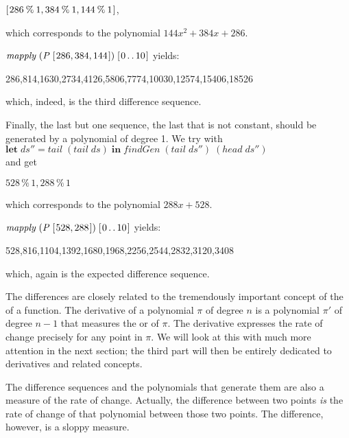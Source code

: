 \documentclass[tikz]{scrreprt}
\newcommand{\Conid}[1]{\mathit{#1}}
\newcommand{\Varid}[1]{\mathit{#1}}
\begin{document}
\ensuremath{[\mskip1.5mu \mathrm{286}\mathbin{\%}\mathrm{1},\mathrm{384}\mathbin{\%}\mathrm{1},\mathrm{144}\mathbin{\%}\mathrm{1}\mskip1.5mu]},

which corresponds to the polynomial 
$144x^2 + 384x + 286$.

\ensuremath{\Varid{mapply}\;(\Conid{P}\;[\mskip1.5mu \mathrm{286},\mathrm{384},\mathrm{144}\mskip1.5mu])\;[\mskip1.5mu \mathrm{0}\mathinner{\ldotp\ldotp}\mathrm{10}\mskip1.5mu]} yields:

286,814,1630,2734,4126,5806,7774,10030,12574,15406,18526

which, indeed, is the third difference sequence.

Finally, the last but one sequence, the last
that is not constant, should be generated by a polynomial
of degree 1. We try with\\
\ensuremath{\mathbf{let}\;\Varid{ds''}\mathrel{=}\Varid{tail}\;(\Varid{tail}\;\Varid{ds})\;\mathbf{in}\;\Varid{findGen}\;(\Varid{tail}\;\Varid{ds''})\;(\Varid{head}\;\Varid{ds''})}\\
and get 

\ensuremath{\mathrm{528}\mathbin{\%}\mathrm{1},\mathrm{288}\mathbin{\%}\mathrm{1}}

which corresponds to the polynomial $288x + 528$.

\ensuremath{\Varid{mapply}\;(\Conid{P}\;[\mskip1.5mu \mathrm{528},\mathrm{288}\mskip1.5mu])\;[\mskip1.5mu \mathrm{0}\mathinner{\ldotp\ldotp}\mathrm{10}\mskip1.5mu]} yields:

528,816,1104,1392,1680,1968,2256,2544,2832,3120,3408

which, again is the expected difference sequence.

The differences are closely related to the tremendously
important concept of the  of a function.
The derivative of a polynomial $\pi$ of degree $n$
is a polynomial $\pi'$ of degree $n-1$ that measures
the  or  of $\pi$.
The derivative expresses the rate of change precisely
for any point in $\pi$. We will look at this with
much more attention in the next section; 
the third part will then be entirely dedicated 
to derivatives and
related concepts.

The difference sequences and the polynomials that generate them
are also a measure of the rate of change.
Actually, the difference between two points \emph{is}
the rate of change of that polynomial between those two points.
The difference, however, is a sloppy measure.
\end{document}
